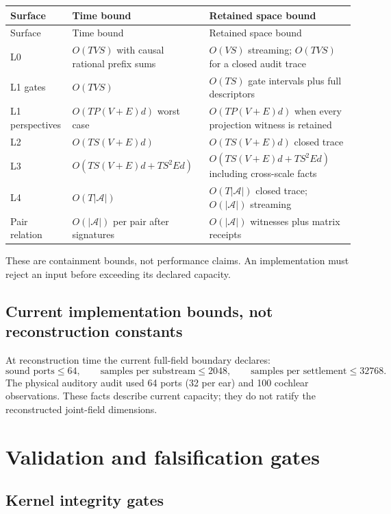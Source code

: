 \documentclass[11pt,oneside]{article}
\newcommand{\Atoms}{\mathcal{A}}
\begin{document}
\begin{longtable}{>{\raggedright\arraybackslash}p{}
                  >{\raggedright\arraybackslash}p{}
                  >{\raggedright\arraybackslash}p{}}
\toprule
Surface & Time bound & Retained space bound\\
\midrule
\endfirsthead
\toprule
Surface & Time bound & Retained space bound\\
\midrule
\endhead
L0 & \(O(TVS)\) with causal rational prefix sums &
\(O(VS)\) streaming; \(O(TVS)\) for a closed audit trace\\
L1 gates & \(O(TVS)\) &
\(O(TS)\) gate intervals plus full descriptors\\
L1 perspectives & \(O(TP(V+E)d)\) worst case &
\(O(TP(V+E)d)\) when every projection witness is retained\\
L2 & \(O(TS(V+E)d)\) &
\(O(TS(V+E)d)\) closed trace\\
L3 & \(O(TS(V+E)d+TS^2Ed)\) &
\(O(TS(V+E)d+TS^2Ed)\) including cross-scale facts\\
L4 & \(O(T|\Atoms|)\) &
\(O(T|\Atoms|)\) closed trace; \(O(|\Atoms|)\) streaming\\
Pair relation & \(O(|\Atoms|)\) per pair after signatures &
\(O(|\Atoms|)\) witnesses plus matrix receipts\\
\bottomrule
\end{longtable}

These are containment bounds, not performance claims. An implementation must
reject an input before exceeding its declared capacity.

\subsection{Current implementation bounds, not reconstruction constants}

At reconstruction time the current full-field boundary declares:
\[
  \text{sound ports}\leq64,\qquad
  \text{samples per substream}\leq2048,\qquad
  \text{samples per settlement}\leq32768.
\]
The physical auditory audit used 64 ports (32 per ear) and 100 cochlear
observations. These facts describe current capacity; they do not ratify the
reconstructed joint-field dimensions.

\section{Validation and falsification gates}

\subsection{Kernel integrity gates}
\end{document}
